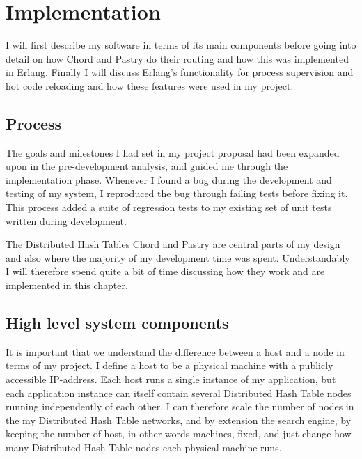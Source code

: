 

\chapter{Implementation}
I will first describe my software in terms of its main components before going into detail on how Chord and Pastry do their routing and how this was implemented in Erlang.
Finally I will discuss Erlang's functionality for process supervision and hot code reloading and how these features were used in my project.

\section{Process}
The goals and milestones I had set in my project proposal had been expanded upon in the pre-development analysis, and guided me through the implementation phase.
Whenever I found a bug during the development and testing of my system, I reproduced the bug through failing tests before fixing it. This process added a suite of regression tests to my existing set of unit tests written during development.

The Distributed Hash Tables Chord and Pastry are central parts of my design and also where the majority of my development time was spent. Understandably I will therefore spend quite a bit of time discussing how they work and are implemented in this chapter.

\section{High level system components}
It is important that we understand the difference between a host and a node in terms of my project. I define a host to be a physical machine with a publicly accessible IP-address. 
Each host runs a single instance of my application, but each application instance can itself contain several Distributed Hash Table nodes running independently of each other. I can therefore scale the number of nodes in the my Distributed Hash Table networks, and by extension the search engine, by keeping the number of host, in other words machines, fixed, and just change how many Distributed Hash Table nodes each physical machine runs.

